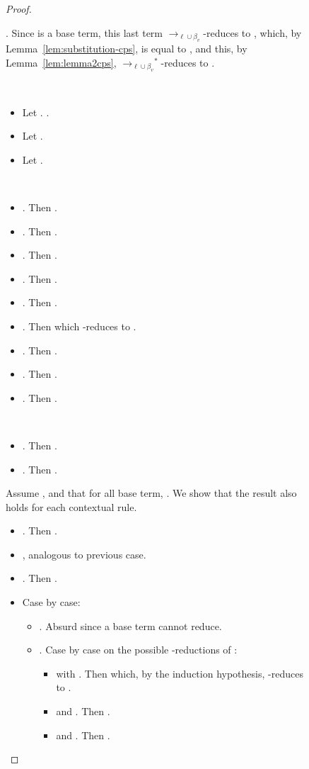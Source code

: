 \documentclass{LMCS}
\newcommand{\xto}[1]{\ensuremath{\rightarrow_{#1}}}
\newcommand{\toblinred}{\xto{\ell\cup\beta_v}}
\newcommand{\stoblinred}{\ensuremath{\xto{\ell\cup\beta_v}^{\ast}}}
\begin{document}
\begin{figure}
{\begin{proof}
\begin{description}
      
      .
      Since  is a base term, this last term \toblinred-reduces to
      ,
      which, by Lemma~\ref{lem:substitution-cps}, is equal to
      ,
      and this, by Lemma~\ref{lem:lemma2cps}, \stoblinred-reduces to
      .
    \item[Rules ]~
      \begin{itemize}
	\item Let  . .
	\item Let  . 
	\item Let  .  
      \end{itemize}
    \item[Rules  and ]~
      \begin{itemize}
	\item . Then .
	\item . Then .
	\item . Then  .
	\item . Then  .
	\item . Then  .
	\item . Then   which -reduces to .
	\item . Then .
	\item . Then  .
	\item . Then  .
      \end{itemize}
    \item[Rules  and ]~
      \begin{itemize}
	\item . Then .
	\item . Then .
      \end{itemize}
    \item[Rules ] Assume , and that for all  base term, . We show that the result also holds for each contextual rule.
      \begin{itemize}
	\item . Then .
	\item , analogous to previous case.
	\item . Then .
	\item  Case by case:
	  \begin{itemize}
	    \item . Absurd since a base term cannot reduce.
	    \item . Case by case on the possible -reductions of :
	      \begin{itemize}
		\item  with . Then   which, by the induction hypothesis, -reduces to .
		\item  and . Then .
		\item  and . Then .

\end{itemize}
\end{itemize}
\end{itemize}
\end{description}
\end{proof}}
\end{figure}
\end{document}
